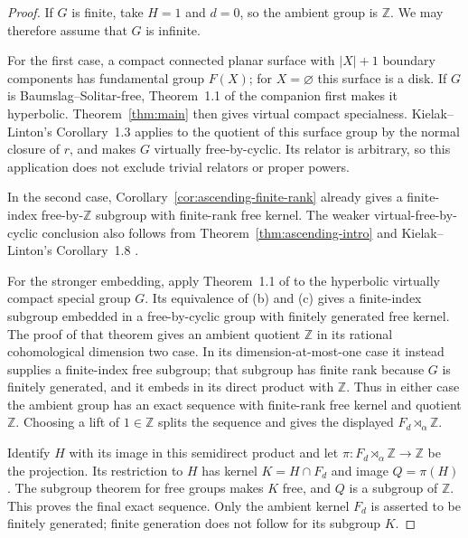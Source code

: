 \begin{proof}
If $G$ is finite, take $H=1$ and $d=0$, so the ambient group is
$\mathbb Z$. We may therefore assume that $G$ is infinite.

For the first case, a compact connected planar surface with $|X|+1$
boundary components has fundamental group $F(X)$; for $X=\varnothing$
this surface is a disk. If $G$ is Baumslag--Solitar-free, Theorem~1.1
of the companion \cite{OpenAIHyperbolicity} first makes it hyperbolic.
Theorem~\ref{thm:main} then gives virtual compact specialness.
Kielak--Linton's Corollary~1.3 \cite{KielakLinton2024Virtually}
applies to the quotient of this surface
group by the normal closure of $r$, and makes $G$ virtually
free-by-cyclic. Its relator is arbitrary, so this application does not
exclude trivial relators or proper powers.

In the second case, Corollary~\ref{cor:ascending-finite-rank} already
gives a finite-index free-by-$\mathbb Z$ subgroup with finite-rank
free kernel. The weaker virtual-free-by-cyclic conclusion also
follows from Theorem~\ref{thm:ascending-intro} and Kielak--Linton's
Corollary~1.8 \cite{KielakLinton2024Virtually}.

For the stronger embedding, apply Theorem~1.1 of
\cite{KielakLinton2024Virtually} to the hyperbolic virtually compact
special group $G$. Its equivalence of (b) and (c) gives a finite-index
subgroup embedded in a free-by-cyclic group with finitely generated
free kernel.
The proof of that theorem gives an ambient quotient $\mathbb Z$ in its
rational cohomological dimension two case. In its dimension-at-most-one
case it instead supplies a finite-index free subgroup; that subgroup has
finite rank because $G$ is finitely generated, and it embeds in its
direct product with $\mathbb Z$. Thus in either case the ambient group
has an exact sequence with finite-rank free kernel and quotient
$\mathbb Z$. Choosing a lift of $1\in\mathbb Z$ splits the sequence and
gives the displayed $F_d\rtimes_\alpha\mathbb Z$.

Identify $H$ with its image in this semidirect product and let
$\pi:F_d\rtimes_\alpha\mathbb Z\to\mathbb Z$ be the projection. Its
restriction to $H$ has kernel $K=H\cap F_d$ and image $Q=\pi(H)$.
The subgroup theorem for free groups makes $K$ free, and $Q$ is a
subgroup of $\mathbb Z$. This proves the final exact sequence. Only the
ambient kernel $F_d$ is asserted to be finitely generated; finite
generation does not follow for its subgroup $K$.
\end{proof}

